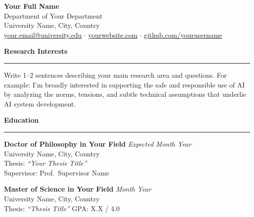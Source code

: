 \documentclass[11pt, a4paper]{article}
\newcommand{\cvsection}[1]{%
  \vspace{10pt}%
  {\large \textbf{#1}}%
  \vspace{3pt}%
  \hrule                        %
  \vspace{6pt}%
}
\begin{document}
\begin{center}
  {\LARGE \textbf{Your Full Name}} \\[4pt]
  Department of Your Department \\
  University Name, City, Country \\[6pt]

  \href{mailto:your.email@university.edu}{your.email@university.edu}
  \quad $\cdot$ \quad               %
  \href{https://yourwebsite.com}{yourwebsite.com}
  \quad $\cdot$ \quad
  \href{https://github.com/yourusername}{github.com/yourusername}
\end{center}

\vspace{4pt}


\cvsection{Research Interests}

Write 1--2 sentences describing your main research area and questions.
For example: I'm broadly interested in supporting the safe and responsible use of AI by analyzing the norms, tensions, and subtle technical assumptions that underlie AI system development.


\cvsection{Education}

\textbf{Doctor of Philosophy in Your Field} \hfill \textit{Expected Month Year} \\{}
University Name, City, Country \\
Thesis: \textit{``Your Thesis Title''} \\
Supervisor: Prof.\ Supervisor Name

\vspace{8pt}

\textbf{Master of Science in Your Field} \hfill \textit{Month Year} \\{}
University Name, City, Country \\
Thesis: \textit{``Thesis Title''} \quad GPA: X.X / 4.0

\vspace{8pt}
\end{document}
